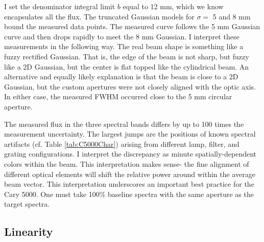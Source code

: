 
I set the denominator integral limit $b$ equal to 12 mm, which we know encapsulates all the flux.  The truncated Gaussian models for $\sigma=$ 5 and 8 mm bound the measured data points.  The measured curve follows the 5 mm Gaussian curve and then drops rapidly to meet the 8 mm Gaussian.  I interpret these measurements in the following way.  The real beam shape is something like a fuzzy rectified Gaussian.  That is, the edge of the beam is not sharp, but fuzzy like a 2D Gaussian, but the center is flat topped like the cylindrical beam.  An alternative and equally likely explanation is that the beam is close to a 2D Gaussian, but the custom apertures were not closely aligned with the optic axis.  In either case, the measured FWHM occurred close to the 5 mm circular aperture.

The measured flux in the three spectral bands differs by up to 100 times the measurement uncertainty.  The largest jumps are the positions of known spectral artifacts (cf. Table \ref{tab:C5000Char}) arising from different lamp, filter, and grating configurations.  I interpret the discrepancy as minute spatially-dependent colors within the beam.  This interpretation makes sense- the fine alignment of different optical elements will shift the relative power around within the average beam vector.  This interpretation underscores an important best practice for the Cary 5000.  One must take 100\% baseline spectra with the same aperture as the target spectra.

\subsection{Linearity}

